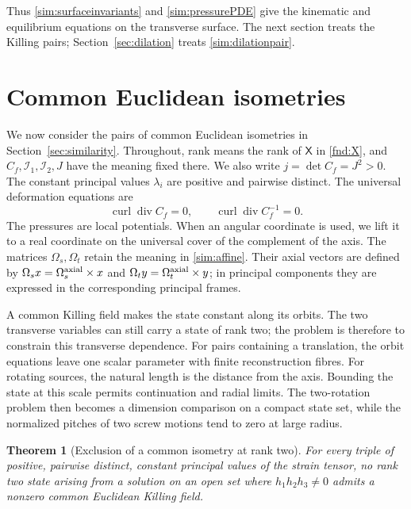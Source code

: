 \documentclass[11pt,a4paper]{article}
\numberwithin{equation}{section}
\theoremstyle{plain}
\newtheorem{theorem}{Theorem}[section]
\theoremstyle{definition}
\theoremstyle{remark}
\begin{document}
Thus \eqref{sim:surfaceinvariants} and \eqref{sim:pressurePDE}
give the kinematic and equilibrium equations on the transverse
surface. The next section treats the Killing pairs; Section~\ref{sec:dilation}
treats \eqref{sim:dilationpair}.

\section{Common Euclidean isometries}\label{iso:section}\label{sec:isometries}

We now consider the pairs of common Euclidean isometries in
Section~\ref{sec:similarity}. Throughout, rank means the rank of
$\mathsf X$ in \eqref{fnd:X}, and $C_f,\mathcal I_1,\mathcal I_2,J$
have the meaning fixed there. We also write $j=\det C_f=J^2>0$.
The constant principal values $\lambda_i$ are positive and pairwise
distinct. The universal deformation equations are
\begin{equation}\label{iso:universal}
 \operatorname{curl}\operatorname{div}C_f=0,\qquad
 \operatorname{curl}\operatorname{div}C_f^{-1}=0.
\end{equation}
The pressures are local potentials. When an angular coordinate is used,
we lift it to a real coordinate on the universal cover of the complement
of the axis. The matrices $\Omega_s,\Omega_t$ retain the meaning in
\eqref{sim:affine}. Their axial vectors are defined by
$\Omega_sx=\Omega_s^{\rm axial}\times x$ and
$\Omega_ty=\Omega_t^{\rm axial}\times y$; in principal components they
are expressed in the corresponding principal frames.

A common Killing field makes the state constant along its orbits.
The two transverse variables can still carry a state of rank two;
the problem is therefore to constrain this transverse dependence.
For pairs containing a translation, the orbit equations leave one
scalar parameter with finite reconstruction fibres. For rotating
sources, the natural length is the distance from the axis. Bounding
the state at this scale permits continuation and radial limits. The
two-rotation problem then becomes a dimension comparison on a compact
state set, while the normalized pitches of two screw motions tend to
zero at large radius.

\begin{theorem}[Exclusion of a common isometry at rank two]\label{iso:theorem}
For every triple of positive, pairwise distinct, constant principal values of the strain tensor, no
rank two state arising from a solution on an open set where $h_1h_2h_3\ne0$ admits a nonzero
common Euclidean Killing field.  
\end{theorem}
\end{document}
